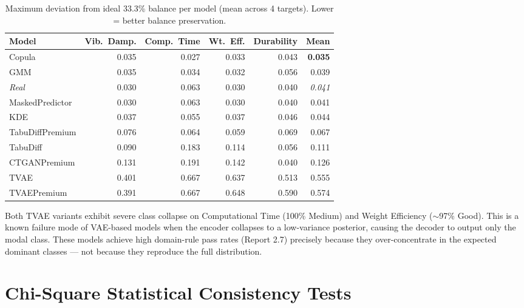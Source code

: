 \documentclass[12pt,a4paper]{article}
\begin{document}
\begin{table}[H]
\centering
\caption{Maximum deviation from ideal 33.3\% balance per model (mean across 4 targets). Lower = better balance preservation.}
\label{tab:imbalance}
\renewcommand{\arraystretch}{1.2}
\begin{tabular}{lrrrrr}
\toprule
\textbf{Model} & \textbf{Vib.\ Damp.} & \textbf{Comp.\ Time} & \textbf{Wt.\ Eff.} & \textbf{Durability} & \textbf{Mean} \\
\midrule
Copula          & 0.035 & 0.027 & 0.033 & 0.043 & \textbf{0.035} \\
GMM             & 0.035 & 0.034 & 0.032 & 0.056 & 0.039 \\
\textit{Real}   & 0.030 & 0.063 & 0.030 & 0.040 & \textit{0.041} \\
MaskedPredictor & 0.030 & 0.063 & 0.030 & 0.040 & 0.041 \\
KDE             & 0.037 & 0.055 & 0.037 & 0.046 & 0.044 \\
TabuDiffPremium & 0.076 & 0.064 & 0.059 & 0.069 & 0.067 \\
TabuDiff        & 0.090 & 0.183 & 0.114 & 0.056 & 0.111 \\
CTGANPremium    & 0.131 & 0.191 & 0.142 & 0.040 & 0.126 \\
TVAE            & 0.401 & 0.667 & 0.637 & 0.513 & \cellcolor{danger!15}0.555 \\
TVAEPremium     & 0.391 & 0.667 & 0.648 & 0.590 & \cellcolor{danger!15}0.574 \\
\bottomrule
\end{tabular}
\end{table}

\begin{tcolorbox}[warningbox, title={TVAE / TVAEPremium Class Collapse}]
Both TVAE variants exhibit severe class collapse on Computational Time (100\% Medium) and Weight Efficiency ($\sim$97\% Good). This is a known failure mode of VAE-based models when the encoder collapses to a low-variance posterior, causing the decoder to output only the modal class. These models achieve high domain-rule pass rates (Report 2.7) precisely because they over-concentrate in the expected dominant classes --- not because they reproduce the full distribution.
\end{tcolorbox}

\section{Chi-Square Statistical Consistency Tests}
\end{document}
